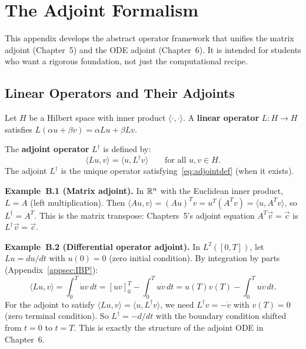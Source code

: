 
\chapter{The Adjoint Formalism}
\label{app:adjointformalism}

This appendix develops the abstract operator framework that unifies
the matrix adjoint (Chapter~5) and the ODE adjoint (Chapter~6).
It is intended for students who want a rigorous foundation, not just
the computational recipe.

\section{Linear Operators and Their Adjoints}
\label{appsec:operators}

Let $H$ be a Hilbert space with inner product $\langle\cdot,\cdot\rangle$.
A \textbf{linear operator} $L : H \to H$ satisfies
$L(\alpha u + \beta v) = \alpha Lu + \beta Lv$.

The \textbf{adjoint operator} $L^\dagger$ is defined by:
\begin{equation}
  \langle Lu, v \rangle = \langle u, L^\dagger v \rangle
  \qquad\text{for all } u, v \in H.
  \label{eq:adjointdef}
\end{equation}
The adjoint $L^\dagger$ is the unique operator satisfying~\eqref{eq:adjointdef}
(when it exists).

\noindent\textbf{Example~B.1 (Matrix adjoint).}
In $\mathbb{R}^n$ with the Euclidean inner product, $L = A$ (left multiplication).
Then $\langle Au, v\rangle = (Au)^T v = u^T(A^T v) = \langle u, A^T v\rangle$,
so $L^\dagger = A^T$.
This is the matrix transpose: Chapters~5's adjoint equation
$A^T\vec{v} = \vec{c}$ is $L^\dagger\vec{v} = \vec{c}$.

\noindent\textbf{Example~B.2 (Differential operator adjoint).}
In $L^2([0,T])$, let $Lu = du/dt$ with $u(0) = 0$ (zero initial condition).
By integration by parts (Appendix~\ref{appsec:IBP}):
\[
  \langle Lu, v\rangle = \int_0^T \dot{u}v\,dt
  = [uv]_0^T - \int_0^T u\dot{v}\,dt
  = u(T)v(T) - \int_0^T u\dot{v}\,dt.
\]
For the adjoint to satisfy $\langle Lu, v\rangle = \langle u, L^\dagger v\rangle$,
we need $L^\dagger v = -\dot{v}$ with $v(T) = 0$ (zero terminal condition).
So $L^\dagger = -d/dt$ with the boundary condition shifted from $t=0$ to $t=T$.
This is exactly the structure of the adjoint ODE in Chapter~6.

